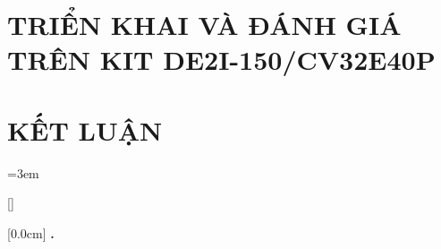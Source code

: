 \documentclass[a4paper,twoside]{report}
\renewcommand{\bibname}{Danh_sach_tai_lieu_tham_khao}
\theoremstyle{definition}
\begin{document}
\newpage
\chapter[TRIỂN KHAI TRÊN DE2I-150/CV32E40P]{TRIỂN KHAI VÀ ĐÁNH GIÁ TRÊN KIT DE2I-150/CV32E40P}
\label{chap:thuc-nghiem}


\newpage
\chapter{KẾT LUẬN}
\label{chap:ket-luan}


\newpage
% 

\newpage
\renewcommand\bibname{TÀI LIỆU THAM KHẢO}
\begingroup
\emergencystretch=3em
\printbibliography
\endgroup
{}

\appendixpage
\appendix
\addappheadtotoc
\renewcommand{\chaptermark}[1]{\markboth{PHỤ LỤC \thechapter.\ #1}{}}

[]
\titlespacing*{\chapter}{0pt}{-20pt}{20pt}

    [0.0cm]             %
    {\bfseries\vspace{0.3cm}}                  %
    {{\bfseries{\scshape} \thecontentslabel.\ }} %
    {}         %
    {\contentspage}

% 
\end{document}

